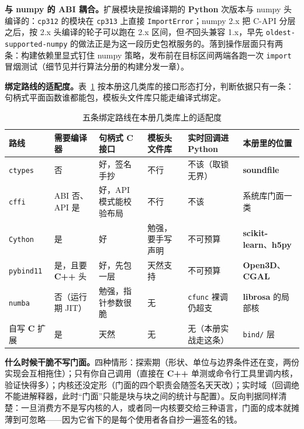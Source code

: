 \documentclass[12pt,a4paper,fontset=fandol]{ctexbook}
\newcommand{\Tp}[1]{\texttt{#1}}
\newcommand{\Bk}{\allowbreak}
\newcommand{\Lib}[1]{\textbf{#1}}
\newcommand{\Lang}[1]{\textsf{\bfseries #1}}
\newcommand{\CL}{\Lang{C}}
\newcommand{\CPP}{\Lang{C++}}
\newcommand{\PY}{\Lang{Python}}
\begin{document}
\textbf{与 numpy 的 ABI 耦合。}扩展模块是按编译期的 \PY{} 次版本与 numpy 头编译的：\Tp{cp312} 的模块在 \Tp{cp313} 上直接 \Tp{ImportError}；numpy 2.x 把 C-API 分层之后，按 2.x 头编译的轮子可以跑在 2.x 区间，但\emph{不}回头兼容 1.x，早先 \Tp{oldest-supported\Bk-numpy} 的做法正是为这一段历史包袱服务的。落到操作层面只有两条：构建依赖里显式钉住 numpy 策略，发布前在目标区间两端各跑一次 \Tp{import} 冒烟测试（细节见并行算法分册的构建分发一章）。

\textbf{绑定路线的适配度。}表~\ref{tab:ch16-bind} 按本册这几类库的接口形态打分，判断依据只有一条：句柄式平面函数谁都能包，模板头文件库只能走编译式绑定。

\begin{table}[H]
\centering
\caption{五条绑定路线在本册几类库上的适配度}
\label{tab:ch16-bind}
\small
\begin{tabular}{@{}>{\raggedright\arraybackslash}p{}
  >{\raggedright\arraybackslash}p{}
  >{\raggedright\arraybackslash}p{}
  >{\raggedright\arraybackslash}p{}
  >{\raggedright\arraybackslash}p{}
  >{\raggedright\arraybackslash}p{}@{}}
\toprule
路线 & 需要编译器 & 句柄式 \CL{} 接口 & 模板头文件库 & 实时回调进 \PY{} & 本册里的位置 \\
\midrule
\Tp{ctypes} & 否 & 好，签名手抄 & 不行 & 不该（取锁无界） &
  \Lib{soundfile} \\
\Tp{cffi} & ABI 否、API 是 & 好，API 模式能校验布局 & 不行 & 不该 &
  系统库门面一类 \\
\Tp{Cython} & 是 & 好 & 勉强，要手写声明 & 不可预算 &
  \Lib{scikit-learn}、\Lib{h5py} \\
\Tp{pybind11} & 是，且要 \CPP{} 头 & 好，先包一层 & 天然支持 & 不可预算 &
  \Lib{Open3D}、\Lib{CGAL} \\
\Tp{numba} & 否（运行期 JIT） & 勉强，指针参数很脆 & 无 & \Tp{cfunc} 裸调仍超支 &
  \Lib{librosa} 的局部核 \\
自写 \CL{} 扩展 & 是 & 天然 & 无 & 无（本册实战走这条） &
  \Tp{bind/} 层 \\
\bottomrule
\end{tabular}
\end{table}

\textbf{什么时候干脆不写门面。}四种情形：探索期（形状、单位与边界条件还在变，两份实现会互相拖住）；只有你自己调用（直接在 \CPP{} 单测或命令行工具里调内核，验证快得多）；内核还没定形（门面的四个职责会随签名天天改）；实时域（回调绝不能进解释器，此时``门面''只能是块与块之间的统计与配置）。反向判据同样清楚：一旦消费方不是写内核的人，或者同一内核要交给三种语言，门面的成本就摊薄到可忽略——因为它省下的是每个使用者各自抄一遍签名的钱。
\end{document}
